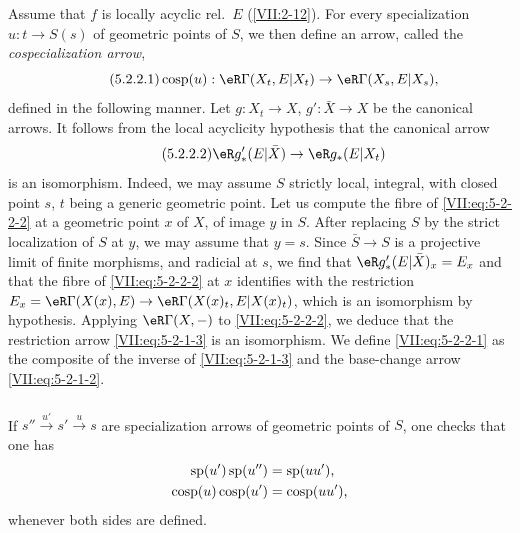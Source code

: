 \subsubsection{}\label{VII:5-2-2}

Assume that $f$ is locally acyclic rel.\ $E$ (\ref{VII:2-12}).
For every specialization $u:t\to S(s)$ of geometric points of $S$, we
then define an arrow, called the \emph{cospecialization arrow},
\begin{equation*}\tag{5.2.2.1}\label{VII:eq:5-2-2-1}
  \cosp(u):\eR\Gamma(X_t,E|X_t) \to \eR\Gamma(X_s,E|X_s) \text{,}
\end{equation*}
defined in the following manner. Let $g:X_t\to X$, $g':\bar X\to X$ be the
canonical arrows. It follows from the local acyclicity hypothesis that
the canonical arrow
\begin{equation*}\tag{5.2.2.2}\label{VII:eq:5-2-2-2}
  \eR g_\ast'(E|\bar X)\to \eR g_\ast(E|X_t)
\end{equation*}
is an isomorphism. Indeed, we may assume $S$ strictly local,
integral, with closed point $s$, $t$ being a generic
geometric point. Let us compute the fibre of \eqref{VII:eq:5-2-2-2} at a
geometric point $x$ of $X$, of image $y$ in $S$. After replacing $S$ by
the strict localization of $S$ at $y$, we may assume that $y=s$. Since
$\bar S\to S$ is a projective limit of finite morphisms, and radicial at $s$, we
find that $\eR g_\ast'(E|\bar X)_x = E_x$ and that the fibre of
\eqref{VII:eq:5-2-2-2} at $x$ identifies with the restriction
$E_x=\eR\Gamma(X(x),E)\to \eR\Gamma(X(x)_t,E|X(x)_t)$, which is an
isomorphism by hypothesis. Applying $\eR\Gamma(X,-)$ to
\eqref{VII:eq:5-2-2-2}, we deduce that the restriction arrow
\eqref{VII:eq:5-2-1-3} is an isomorphism. We define \eqref{VII:eq:5-2-2-1}
as the composite of the inverse of \eqref{VII:eq:5-2-1-3} and the
base-change arrow \eqref{VII:eq:5-2-1-2}.




\subsubsection{}\label{VII:5-2-3}

If $s'' \xrightarrow{u'} s' \xrightarrow u s$ are specialization
arrows of geometric points of $S$, one checks that one has
\begin{align*}
  \operatorname{sp}(u')\operatorname{sp}(u'') &= \operatorname{sp}(u u') \text{,} \\
  \operatorname{cosp}(u) \operatorname{cosp}(u') &= \operatorname{cosp}(u u') \text{,}
\end{align*}
whenever both sides are defined.




